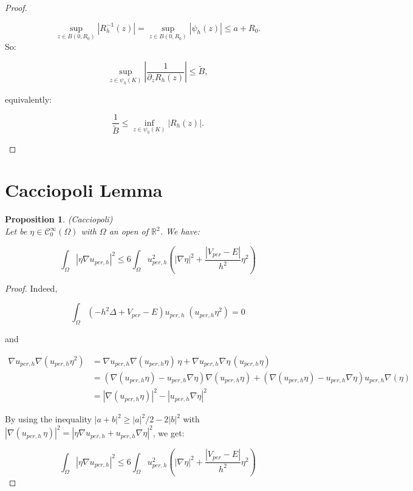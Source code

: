 \documentclass[leqno,11pt,letterpaper, english]{amsart}
\newcommand{\nn}{\nonumber}
\theoremstyle{plain}
\newtheorem{prop}{Proposition}[section]
\theoremstyle{definition}
\numberwithin{equation}{section}
\begin{document}
\begin{proof}
\begin{itemize}
			\begin{equation}
				\sup_{z\in B(0,R_0)} | R_h^{-1}(z)|=\sup_{z\in B(0,R_0)} | \psi_h(z)|\leq a+R_0.
			\end{equation}
			So:
			
			\begin{equation}
				\sup_{z\in \psi_h(K)}\left|\frac{1}{\partial_z R_h(z)}\right|\leq \tilde{B},
			\end{equation}
			
			equivalently:
			
			\begin{equation}
				\frac{1}{\tilde{B}}\leq \inf_{z\in \psi_h(K)}|R_h(z)|.
			\end{equation}
			
		\end{itemize}
	\end{proof}
\section{Cacciopoli Lemma}
\label{subsect: Cacciopoli}
	\begin{prop}(Cacciopoli)\\
		Let be $\eta \in \mathcal{C}_0^\infty(\Omega)$ with $\Omega$ an open of $\mathbb{R}^2$. We have:
		
		\begin{equation}
			\int_{\Omega}|\eta\nabla u_{per,h}|^2 \leq 6\int_{\Omega}u_{per,h}^2 \left( |\nabla \eta|^2 + \frac{|V_{per}-E|}{h^2}\eta^2 \right)
		\end{equation}
		
	\end{prop}
	
	\begin{proof}
		
		Indeed,
		
		\begin{equation}
			\int_{\Omega}(-h^2\Delta+V_{per}-E)u_{per,h}\; (u_{per,h}\eta^2)=0
		\end{equation}
		
		and 
		
		\begin{align}
			\nabla u_{per,h} \nabla (u_{per,h}\eta^2) &= \nabla u_{per,h} \nabla (u_{per,h}\eta)\,\eta+ \nabla u_{per,h} \nabla \eta\,(u_{per,h}\eta)\nn\\
			&=(\nabla (u_{per,h}\eta) -u_{per,h}\nabla \eta)\nabla(u_{per,h}\eta)+ (\nabla (u_{per,h}\eta) -u_{per,h}\nabla \eta)u_{per,h}\nabla(\eta)\nn\\
			&=|\nabla (u_{per,h}\eta)|^2 -|u_{per,h}\nabla \eta|^2
		\end{align}
		
		By using the inequality $|a+b|^2\geq |a|^2/2-2|b|^2$ with $|\nabla( u_{per,h}\, \eta)|^2 =|\eta\nabla u_{per,h} +u_{per,h}\nabla  \eta|^2$,
		we get:
		
		\begin{equation}
			\int_{\Omega}|\eta\nabla u_{per,h}|^2 \leq 6\int_{\Omega}u_{per,h}^2 \left( |\nabla \eta|^2 + \frac{|V_{per}-E|}{h^2}\eta^2 \right)
		\end{equation}
		
	\end{proof}
\end{document}
